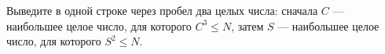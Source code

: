 Выведите в одной строке через пробел два целых числа: сначала $C$ --- наибольшее целое число, для которого $C^3 \le N$, затем $S$ --- наибольшее целое число, для которого $S^2 \le N$.
